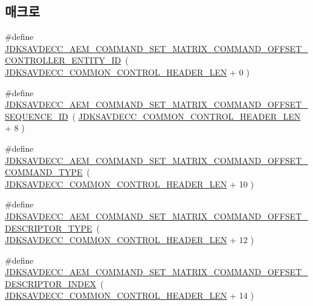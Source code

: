 \subsection*{매크로}
\begin{DoxyCompactItemize}
\item 
\#define \hyperlink{group__command__set__matrix_ga2d82545c0f7d891ce446159e72fc0632}{J\+D\+K\+S\+A\+V\+D\+E\+C\+C\+\_\+\+A\+E\+M\+\_\+\+C\+O\+M\+M\+A\+N\+D\+\_\+\+S\+E\+T\+\_\+\+M\+A\+T\+R\+I\+X\+\_\+\+C\+O\+M\+M\+A\+N\+D\+\_\+\+O\+F\+F\+S\+E\+T\+\_\+\+C\+O\+N\+T\+R\+O\+L\+L\+E\+R\+\_\+\+E\+N\+T\+I\+T\+Y\+\_\+\+ID}~( \hyperlink{group__jdksavdecc__avtp__common__control__header_gaae84052886fb1bb42f3bc5f85b741dff}{J\+D\+K\+S\+A\+V\+D\+E\+C\+C\+\_\+\+C\+O\+M\+M\+O\+N\+\_\+\+C\+O\+N\+T\+R\+O\+L\+\_\+\+H\+E\+A\+D\+E\+R\+\_\+\+L\+EN} + 0 )
\item 
\#define \hyperlink{group__command__set__matrix_ga1e98bac6b594b23c0515f781cab308f0}{J\+D\+K\+S\+A\+V\+D\+E\+C\+C\+\_\+\+A\+E\+M\+\_\+\+C\+O\+M\+M\+A\+N\+D\+\_\+\+S\+E\+T\+\_\+\+M\+A\+T\+R\+I\+X\+\_\+\+C\+O\+M\+M\+A\+N\+D\+\_\+\+O\+F\+F\+S\+E\+T\+\_\+\+S\+E\+Q\+U\+E\+N\+C\+E\+\_\+\+ID}~( \hyperlink{group__jdksavdecc__avtp__common__control__header_gaae84052886fb1bb42f3bc5f85b741dff}{J\+D\+K\+S\+A\+V\+D\+E\+C\+C\+\_\+\+C\+O\+M\+M\+O\+N\+\_\+\+C\+O\+N\+T\+R\+O\+L\+\_\+\+H\+E\+A\+D\+E\+R\+\_\+\+L\+EN} + 8 )
\item 
\#define \hyperlink{group__command__set__matrix_gabf16037284ffb81f28b8cc61b0debfb7}{J\+D\+K\+S\+A\+V\+D\+E\+C\+C\+\_\+\+A\+E\+M\+\_\+\+C\+O\+M\+M\+A\+N\+D\+\_\+\+S\+E\+T\+\_\+\+M\+A\+T\+R\+I\+X\+\_\+\+C\+O\+M\+M\+A\+N\+D\+\_\+\+O\+F\+F\+S\+E\+T\+\_\+\+C\+O\+M\+M\+A\+N\+D\+\_\+\+T\+Y\+PE}~( \hyperlink{group__jdksavdecc__avtp__common__control__header_gaae84052886fb1bb42f3bc5f85b741dff}{J\+D\+K\+S\+A\+V\+D\+E\+C\+C\+\_\+\+C\+O\+M\+M\+O\+N\+\_\+\+C\+O\+N\+T\+R\+O\+L\+\_\+\+H\+E\+A\+D\+E\+R\+\_\+\+L\+EN} + 10 )
\item 
\#define \hyperlink{group__command__set__matrix_gad2f7cf583a047cf627bb5878eb55fad4}{J\+D\+K\+S\+A\+V\+D\+E\+C\+C\+\_\+\+A\+E\+M\+\_\+\+C\+O\+M\+M\+A\+N\+D\+\_\+\+S\+E\+T\+\_\+\+M\+A\+T\+R\+I\+X\+\_\+\+C\+O\+M\+M\+A\+N\+D\+\_\+\+O\+F\+F\+S\+E\+T\+\_\+\+D\+E\+S\+C\+R\+I\+P\+T\+O\+R\+\_\+\+T\+Y\+PE}~( \hyperlink{group__jdksavdecc__avtp__common__control__header_gaae84052886fb1bb42f3bc5f85b741dff}{J\+D\+K\+S\+A\+V\+D\+E\+C\+C\+\_\+\+C\+O\+M\+M\+O\+N\+\_\+\+C\+O\+N\+T\+R\+O\+L\+\_\+\+H\+E\+A\+D\+E\+R\+\_\+\+L\+EN} + 12 )
\item 
\#define \hyperlink{group__command__set__matrix_ga71eb4c95df20046f453be228dbbfd743}{J\+D\+K\+S\+A\+V\+D\+E\+C\+C\+\_\+\+A\+E\+M\+\_\+\+C\+O\+M\+M\+A\+N\+D\+\_\+\+S\+E\+T\+\_\+\+M\+A\+T\+R\+I\+X\+\_\+\+C\+O\+M\+M\+A\+N\+D\+\_\+\+O\+F\+F\+S\+E\+T\+\_\+\+D\+E\+S\+C\+R\+I\+P\+T\+O\+R\+\_\+\+I\+N\+D\+EX}~( \hyperlink{group__jdksavdecc__avtp__common__control__header_gaae84052886fb1bb42f3bc5f85b741dff}{J\+D\+K\+S\+A\+V\+D\+E\+C\+C\+\_\+\+C\+O\+M\+M\+O\+N\+\_\+\+C\+O\+N\+T\+R\+O\+L\+\_\+\+H\+E\+A\+D\+E\+R\+\_\+\+L\+EN} + 14 )

\end{DoxyCompactItemize}
